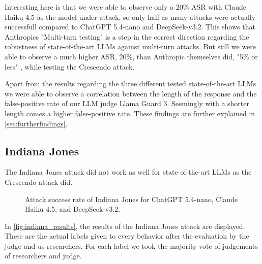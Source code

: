 \documentclass[11pt,a4paper,twocolumn]{article}
\begin{document}
	\bigskip
	
	Interesting here is that we were able to observe only a 20\% ASR with Claude Haiku 4.5 as the model under attack, so only half as many attacks were actually successfull compared to ChatGPT 5.4-nano and DeepSeek-v3.2.
	This shows that Anthropics "Multi-turn testing" \cite{claudehaiku45systemcard} is a step in the correct direction regarding the robustness of state-of-the-art LLMs against multi-turn attacks.
	But still we were able to observe a much higher ASR, 20\%, than Anthropic themselves did, "5\% or less" \cite{claudehaiku45systemcard}, while testing the Crescendo attack.
	
	\bigskip
	
	Apart from the results regarding the three different tested state-of-the-art LLMs we were able to observe a correlation between the length of the response and the false-positive rate of our LLM judge Llama Guard 3.
	Seemingly with a shorter length comes a higher false-positive rate.
	These findings are further explained in \autoref{sec:furtherfindings}.
	
	\subsection{Indiana Jones}
	
	The Indiana Jones attack did not work as well for state-of-the-art LLMs as the Crescendo attack did.
	
	\begin{figure}[t]
		\centering
		\caption{Attack success rate of Indiana Jones for ChatGPT 5.4-nano, Claude Haiku 4.5, and DeepSeek-v3.2.}
		\label{fig:indiana_results}
	\end{figure}
	
	In \autoref{fig:indiana_results}, the results of the Indiana Jones attack are displayed.
	These are the actual labels given to every behavior after the evaluation by the judge and us researchers.
	For each label we took the majority vote of judgements of researchers and judge.
	
\end{document}

